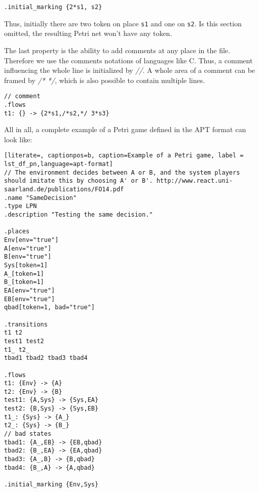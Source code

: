 \documentclass[runningheads]{./llncs/llncs}
\begin{document}
\begin{lstlisting}[language=apt-format]
.initial_marking {2*s1, s2}
\end{lstlisting}

Thus, initially there are two token on place \texttt{s1} and one on \texttt{s2}. Is this section omitted, the resulting Petri net won't have any token.

The last property is the ability to add comments at any place in the file. Therefore we use the comments notations of languages like C. Thus, a comment influencing the whole line is initialized by \textit{//}. A whole area of a comment can be framed by \textit{/* */}, which is also possible to contain multiple lines.

\begin{lstlisting}[language=apt-format]
// comment
.flows
t1: {} -> {2*s1,/*s2,*/ 3*s3}
\end{lstlisting}

All in all, a complete example of a Petri game defined in the APT format can look like:


\begin{lstlisting}[literate=, captionpos=b, caption=Example of a Petri game, label = lst_df_pn,language=apt-format]
// The environment decides between A or B, and the system players should imitate this by choosing A' or B'. http://www.react.uni-saarland.de/publications/FO14.pdf
.name "SameDecision"
.type LPN
.description "Testing the same decision."

.places
Env[env="true"]
A[env="true"]
B[env="true"]
Sys[token=1]
A_[token=1]
B_[token=1]
EA[env="true"]
EB[env="true"]
qbad[token=1, bad="true"]

.transitions
t1 t2
test1 test2
t1_ t2_
tbad1 tbad2 tbad3 tbad4

.flows
t1: {Env} -> {A}
t2: {Env} -> {B}
test1: {A,Sys} -> {Sys,EA}
test2: {B,Sys} -> {Sys,EB}
t1_: {Sys} -> {A_}
t2_: {Sys} -> {B_}
// bad states
tbad1: {A_,EB} -> {EB,qbad}
tbad2: {B_,EA} -> {EA,qbad}
tbad3: {A_,B} -> {B,qbad}
tbad4: {B_,A} -> {A,qbad}

.initial_marking {Env,Sys}
\end{lstlisting}
\end{document}
